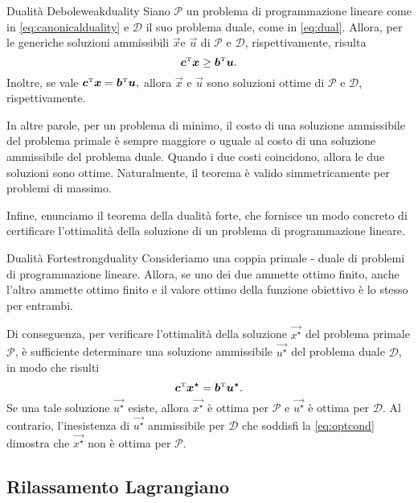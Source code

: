 \begin{thmbox}{Dualità Debole}{weakduality}
    Siano \( \mathcal{P} \) un problema di programmazione lineare come in \eqref{eq:canonicalduality} e \( \mathcal{D}
    \) il suo problema duale, come in \eqref{eq:dual}. Allora, per le generiche soluzioni ammissibili \( \vec{x} \text{
    e } \vec{u} \) di \( \mathcal{P} \) e \( \mathcal{D} \), rispettivamente, risulta
    \[
        \bm{c}^{\scriptscriptstyle\mathrm{T}} \bm{x} \geq \bm{b}^{\scriptscriptstyle\mathrm{T}}\bm{u}.
    \]
    Inoltre, se vale
    \(
        \bm{c}^{\scriptscriptstyle\mathrm{T}} \bm{x} = \bm{b}^{\scriptscriptstyle\mathrm{T}}\bm{u},
    \)
    allora \( \vec{x} \) e \( \vec{u} \) sono soluzioni ottime di \( \mathcal{P} \) e \( \mathcal{D} \),
    rispettivamente.
\end{thmbox}
In altre parole, per un problema di minimo, il costo di una soluzione ammissibile del problema primale è sempre maggiore
o uguale al costo di una soluzione ammissibile del problema duale. Quando i due costi coincidono, allora le due
soluzioni sono ottime. Naturalmente, il teorema è valido simmetricamente per problemi di massimo.

Infine, enunciamo il teorema della dualità forte, che fornisce un modo concreto di certificare l'ottimalità della
soluzione di un problema di programmazione lineare.

\begin{thmbox}{Dualità Forte}{strongduality}
    Consideriamo una coppia primale - duale di problemi di programmazione
    lineare. Allora, se uno dei due ammette ottimo finito, anche l'altro
    ammette ottimo finito e il valore ottimo della funzione obiettivo è lo
    stesso per entrambi.
\end{thmbox}
Di conseguenza, per verificare l'ottimalità della soluzione \( \vec{x^{\star}} \) del problema primale \( \mathcal{P}
\), è sufficiente determinare una soluzione ammissibile \( \vec{u^{\star}} \) del problema duale \( \mathcal{D} \), in
modo che risulti
\begin{equation}\label{eq:optcond}
    \bm{c}^{\scriptscriptstyle\mathrm{T}}\bm{x^{\star}} = \bm{b}^{\scriptscriptstyle\mathrm{T}}\bm{u^{\star}}.
\end{equation}
Se una tale soluzione \( \vec{u^{\star}} \) esiste, allora \( \vec{x^{\star}} \) è ottima per \( \mathcal{P} \) e \(
\vec{u^{\star}} \) è ottima per \( \mathcal{D} \). Al contrario, l'inesistenza di \( \vec{u^{\star}} \) ammissibile per
\( \mathcal{D} \) che soddisfi la \eqref{eq:optcond} dimostra che \( \vec{x^{\star}} \) non è ottima per \( \mathcal{P}
\).

\subsection{Rilassamento Lagrangiano} \label{sec:lr}


